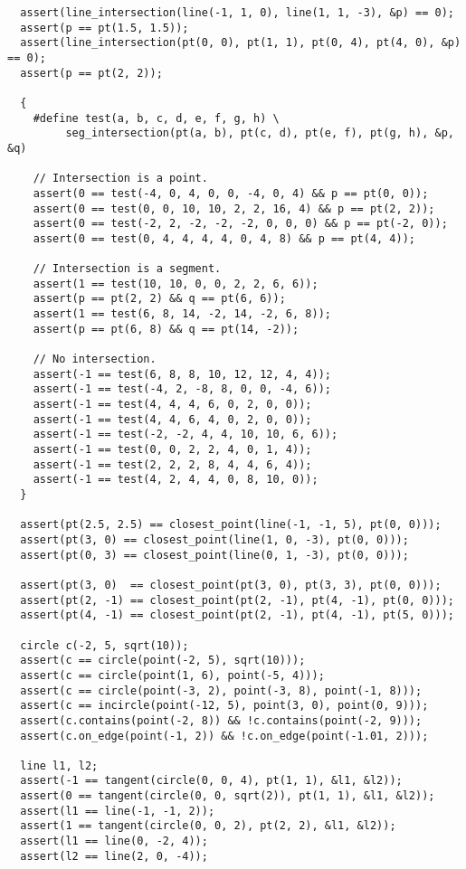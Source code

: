 \begin{lstlisting}
  assert(line_intersection(line(-1, 1, 0), line(1, 1, -3), &p) == 0);
  assert(p == pt(1.5, 1.5));
  assert(line_intersection(pt(0, 0), pt(1, 1), pt(0, 4), pt(4, 0), &p) == 0);
  assert(p == pt(2, 2));

  {
    #define test(a, b, c, d, e, f, g, h) \
         seg_intersection(pt(a, b), pt(c, d), pt(e, f), pt(g, h), &p, &q)

    // Intersection is a point.
    assert(0 == test(-4, 0, 4, 0, 0, -4, 0, 4) && p == pt(0, 0));
    assert(0 == test(0, 0, 10, 10, 2, 2, 16, 4) && p == pt(2, 2));
    assert(0 == test(-2, 2, -2, -2, -2, 0, 0, 0) && p == pt(-2, 0));
    assert(0 == test(0, 4, 4, 4, 4, 0, 4, 8) && p == pt(4, 4));

    // Intersection is a segment.
    assert(1 == test(10, 10, 0, 0, 2, 2, 6, 6));
    assert(p == pt(2, 2) && q == pt(6, 6));
    assert(1 == test(6, 8, 14, -2, 14, -2, 6, 8));
    assert(p == pt(6, 8) && q == pt(14, -2));

    // No intersection.
    assert(-1 == test(6, 8, 8, 10, 12, 12, 4, 4));
    assert(-1 == test(-4, 2, -8, 8, 0, 0, -4, 6));
    assert(-1 == test(4, 4, 4, 6, 0, 2, 0, 0));
    assert(-1 == test(4, 4, 6, 4, 0, 2, 0, 0));
    assert(-1 == test(-2, -2, 4, 4, 10, 10, 6, 6));
    assert(-1 == test(0, 0, 2, 2, 4, 0, 1, 4));
    assert(-1 == test(2, 2, 2, 8, 4, 4, 6, 4));
    assert(-1 == test(4, 2, 4, 4, 0, 8, 10, 0));
  }

  assert(pt(2.5, 2.5) == closest_point(line(-1, -1, 5), pt(0, 0)));
  assert(pt(3, 0) == closest_point(line(1, 0, -3), pt(0, 0)));
  assert(pt(0, 3) == closest_point(line(0, 1, -3), pt(0, 0)));

  assert(pt(3, 0)  == closest_point(pt(3, 0), pt(3, 3), pt(0, 0)));
  assert(pt(2, -1) == closest_point(pt(2, -1), pt(4, -1), pt(0, 0)));
  assert(pt(4, -1) == closest_point(pt(2, -1), pt(4, -1), pt(5, 0)));

  circle c(-2, 5, sqrt(10));
  assert(c == circle(point(-2, 5), sqrt(10)));
  assert(c == circle(point(1, 6), point(-5, 4)));
  assert(c == circle(point(-3, 2), point(-3, 8), point(-1, 8)));
  assert(c == incircle(point(-12, 5), point(3, 0), point(0, 9)));
  assert(c.contains(point(-2, 8)) && !c.contains(point(-2, 9)));
  assert(c.on_edge(point(-1, 2)) && !c.on_edge(point(-1.01, 2)));

  line l1, l2;
  assert(-1 == tangent(circle(0, 0, 4), pt(1, 1), &l1, &l2));
  assert(0 == tangent(circle(0, 0, sqrt(2)), pt(1, 1), &l1, &l2));
  assert(l1 == line(-1, -1, 2));
  assert(1 == tangent(circle(0, 0, 2), pt(2, 2), &l1, &l2));
  assert(l1 == line(0, -2, 4));
  assert(l2 == line(2, 0, -4));


\end{lstlisting}
